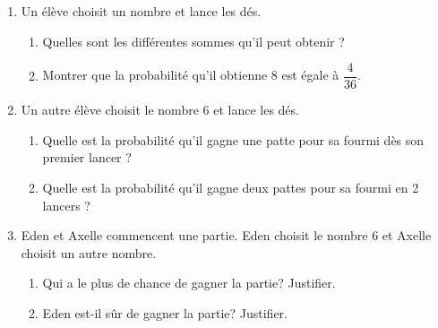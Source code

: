 \begin{enumerate}
  \item Un élève choisit un nombre et lance les dés.
	\begin{enumerate}
		\item Quelles sont les différentes sommes qu'il peut obtenir ?
		\item Montrer que la probabilité qu'il obtienne 8 est égale à $\dfrac{4}{36}$.
	\end{enumerate}
  \item Un autre élève choisit le nombre 6 et lance les dés.
	\begin{enumerate}
		\item Quelle est la probabilité qu'il gagne une patte pour sa fourmi dès son premier lancer ?
		\item Quelle est la probabilité qu'il gagne deux pattes pour sa fourmi en 2 lancers ?
	\end{enumerate}
  \item Eden et Axelle commencent une partie. Eden choisit le nombre 6 et Axelle choisit un autre nombre.
	\begin{enumerate}
		\item Qui a le plus de chance de gagner la partie? Justifier.
		\item Eden est-il sûr de gagner la partie? Justifier.
	\end{enumerate}
\end{enumerate}